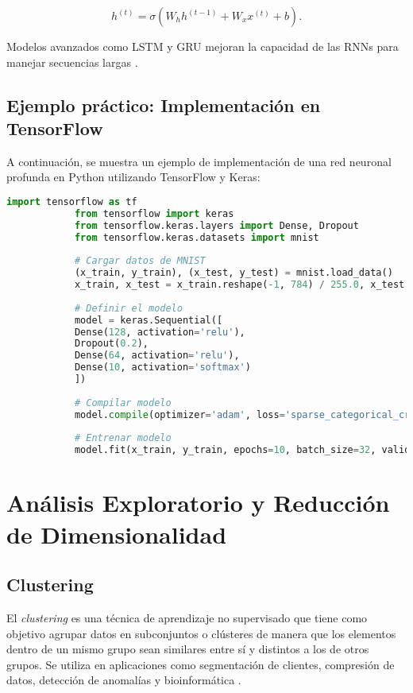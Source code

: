 \begin{itemize}
		\begin{equation}
			h^{(t)} = \sigma(W_h h^{(t-1)} + W_x x^{(t)} + b).
		\end{equation}
		
		Modelos avanzados como LSTM y GRU mejoran la capacidad de las RNNs para manejar secuencias largas \cite{hochreiter1997long}.
		
		\subsection{Ejemplo práctico: Implementación en TensorFlow}
		
		A continuación, se muestra un ejemplo de implementación de una red neuronal profunda en Python utilizando TensorFlow y Keras:
		
		\begin{lstlisting}[language=Python, caption={Red neuronal profunda en TensorFlow}]
			import tensorflow as tf
			from tensorflow import keras
			from tensorflow.keras.layers import Dense, Dropout
			from tensorflow.keras.datasets import mnist
			
			# Cargar datos de MNIST
			(x_train, y_train), (x_test, y_test) = mnist.load_data()
			x_train, x_test = x_train.reshape(-1, 784) / 255.0, x_test.reshape(-1, 784) / 255.0
			
			# Definir el modelo
			model = keras.Sequential([
			Dense(128, activation='relu'),
			Dropout(0.2),
			Dense(64, activation='relu'),
			Dense(10, activation='softmax')
			])
			
			# Compilar modelo
			model.compile(optimizer='adam', loss='sparse_categorical_crossentropy', metrics=['accuracy'])
			
			# Entrenar modelo
			model.fit(x_train, y_train, epochs=10, batch_size=32, validation_data=(x_test, y_test))
		\end{lstlisting}
		
		\section{Análisis Exploratorio y Reducción de Dimensionalidad}
		
		\subsection{Clustering}
		
		El \textit{clustering} es una técnica de aprendizaje no supervisado que tiene como objetivo agrupar datos en subconjuntos o clústeres de manera que los elementos dentro de un mismo grupo sean similares entre sí y distintos a los de otros grupos. Se utiliza en aplicaciones como segmentación de clientes, compresión de datos, detección de anomalías y bioinformática \cite{jain1999data}.
		

\end{itemize}
